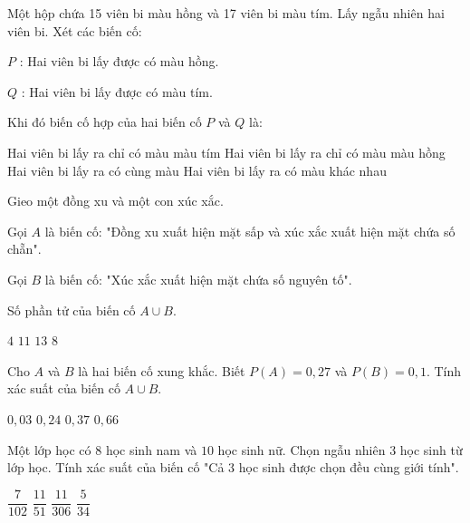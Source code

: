 \documentclass[12pt,a4paper]{article}
\begin{document}
\begin{ex}
 Một hộp chứa 15 viên bi màu hồng và 17 viên bi màu tím. Lấy ngẫu nhiên hai viên bi. Xét các biến cố:

${P}$ : Hai viên bi lấy được có màu hồng.

${Q}$ : Hai viên bi lấy được có màu tím.

Khi đó biến cố hợp của hai biến cố ${P}$ và ${Q}$ là:
 
\choice
{ Hai viên bi lấy ra chỉ có màu màu tím }
   { Hai viên bi lấy ra chỉ có màu màu hồng }
     { \True Hai viên bi lấy ra có cùng màu }
    { Hai viên bi lấy ra có màu khác nhau }
\end{ex}

\begin{ex}
 Gieo một đồng xu và một con xúc xắc.

Gọi ${A}$ là biến cố: "Đồng xu xuất hiện mặt sấp và xúc xắc xuất hiện mặt chứa số chẵn".

Gọi ${B}$ là biến cố: "Xúc xắc xuất hiện mặt chứa số nguyên tố".

Số phần tử của biến cố $A \cup B$.
 
\choice
{ ${4}$ }
   { ${11}$ }
     { ${13}$ }
    { \True ${8}$ }
\end{ex}

\begin{ex}
 Cho ${A}$ và ${B}$ là hai biến cố xung khắc. Biết $P(A)=0,27$ và $P(B)=0,1$. Tính xác suất của biến cố ${A \cup B}$.
 
\choice
{ ${0,03}$ }
   { ${0,24}$ }
     { \True ${0,37}$ }
    { ${0,66}$ }
\end{ex}

\begin{ex}
 Một lớp học có ${8}$ học sinh nam và ${10}$ học sinh nữ. Chọn ngẫu nhiên ${3}$ học sinh từ lớp học. Tính xác suất của biến cố "Cả ${3}$ học sinh được chọn đều cùng giới tính".
 
\choice
{ ${\dfrac{7}{102}}$ }
   { \True ${\dfrac{11}{51}}$ }
     { ${\dfrac{11}{306}}$ }
    { ${\dfrac{5}{34}}$ }
\end{ex}
\end{document}
